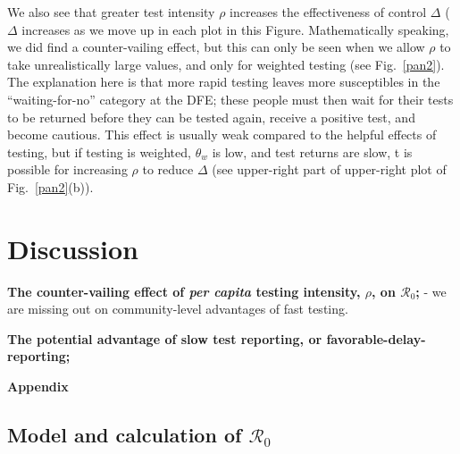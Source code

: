 \documentclass[12pt]{article}
\newcommand{\fref}[1]{Fig.~\ref{#1}}
\newcommand{\percap}{\emph{per capita}\xspace}
\newcommand{\Rnum}{\ensuremath{\mathcal{R}_0}}
\DeclareRobustCommand\_{\ifmmode\expandafter\subtxt\else\textunderscore\fi}
\theoremstyle{definition} %
\begin{document}
We also see that greater test intensity $\rho$ increases the effectiveness of control $\Delta$ ($\Delta$ increases as we move up in each plot in this Figure. Mathematically speaking, we did find a counter-vailing effect, but this can only be seen when we allow $\rho$ to take unrealistically large values, and only for weighted testing (see \fref{pan2}). The explanation here is that more rapid testing leaves more susceptibles in the ``waiting-for-no'' category at the DFE; these people must then wait for their tests to be returned before they can be tested again, receive a positive test, and become cautious. This effect is usually weak compared to the helpful effects of testing, but if testing is weighted, $\theta_w$ is low, and test returns are slow, t is possible for increasing $\rho$ to reduce $\Delta$ (see upper-right part of upper-right plot of \fref{pan2}(b)).



\section{Discussion}

{\bf The counter-vailing effect of \percap testing intensity, $\rho$, on $\Rnum$;}
- we are missing out on community-level advantages of fast testing.

{\bf The potential advantage of slow test reporting, or favorable-delay-reporting;}





\clearpage
\begin{center}
\textbf{\large Appendix}
\end{center}
\setcounter{equation}{0}
\setcounter{figure}{0}
\setcounter{table}{0}
\makeatletter
\renewcommand{\theequation}{A\arabic{equation}}
\renewcommand{\thefigure}{A\arabic{figure}}
\renewcommand{\bibnumfmt}[1]{[A#1]}
\renewcommand{\citenumfont}[1]{A#1}

\subsection{Model and calculation of $\Rnum$}\label{app:R0}
\end{document}
